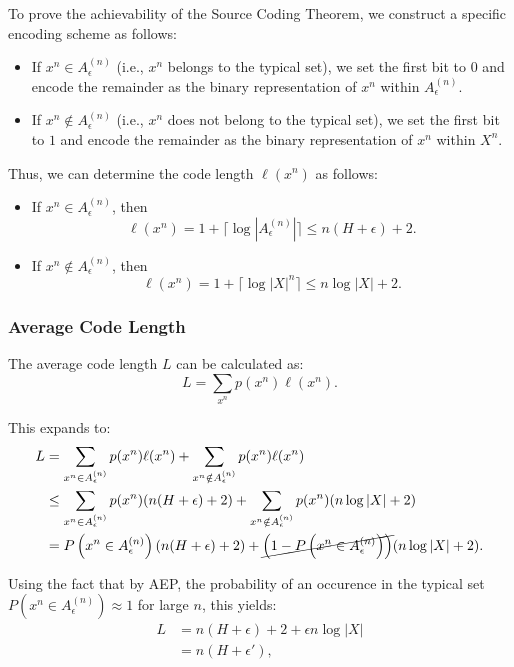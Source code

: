 To prove the achievability of the Source Coding Theorem, we construct a specific encoding scheme as follows:

\begin{itemize}
    \item If \( x^n \in A^{(n)}_\epsilon \) (i.e., \( x^n \) belongs to the typical set), we set the first bit to \(0\) and encode the remainder as the binary representation of \( x^n \) within \( A^{(n)}_\epsilon \).
    \item If \( x^n \notin A^{(n)}_\epsilon \) (i.e., \( x^n \) does not belong to the typical set), we set the first bit to \(1\) and encode the remainder as the binary representation of \( x^n \) within \( X^n \).
\end{itemize}

Thus, we can determine the code length \( \ell(x^n) \) as follows:
\begin{itemize}
    \item If \( x^n \in A^{(n)}_\epsilon \), then
          \[
              \ell(x^n) = 1 + \lceil \log |A^{(n)}_\epsilon| \rceil \leq n(H + \epsilon) + 2.
          \]
    \item If \( x^n \notin A^{(n)}_\epsilon \), then
          \[
              \ell(x^n) = 1 + \lceil \log |X|^n \rceil \leq n \log |X| + 2.
          \]
\end{itemize}

\subsubsection{Average Code Length}

The average code length \( L \) can be calculated as:
\[
    L = \sum_{x^n} p(x^n) \ell(x^n).
\]

This expands to:
\begin{align*}
    L & = \sum_{x^n \in A^{(n)}_\epsilon} p(x^n) \ell(x^n) + \sum_{x^n \notin A^{(n)}_\epsilon} p(x^n) \ell(x^n)                                            \\
      & \leq \sum_{x^n \in A^{(n)}_\epsilon} p(x^n) (n(H + \epsilon) + 2) + \sum_{x^n \notin A^{(n)}_\epsilon} p(x^n) (n \log |X| + 2)                      \\
      & = P\left(x^n \in A^{(n)}_\epsilon\right) (n(H + \epsilon) + 2) + \cancel{\left(1 - P\left(x^n \in A^{(n)}_\epsilon\right)\right)} (n \log |X| + 2).
\end{align*}


Using the fact that by AEP, the probability of an occurence in the typical set  \( P\left(x^n \in A^{(n)}_\epsilon\right) \approx 1 \) for large \( n \), this yields:
\begin{align*}
    L & = n(H + \epsilon) + 2 + \epsilon n \log |X| \\
      & = n(H + \epsilon'),
\end{align*}


